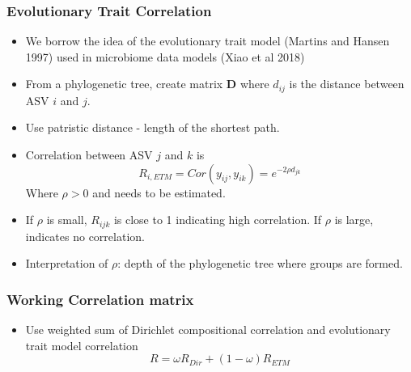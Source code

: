 \documentclass{beamer}
\begin{document}
\begin{frame}
\frametitle{Evolutionary Trait Correlation}
\begin{itemize}
  \item We borrow the idea of the evolutionary trait model (Martins and Hansen 1997) used in microbiome data models (Xiao et al 2018)
  \item From a phylogenetic tree, create matrix $\mathbf{D}$ where $d_{ij}$ is the distance between ASV $i$ and $j$.
  \item Use patristic distance - length of the shortest path.
  \item Correlation between ASV $j$ and $k$ is
  $$R_{i,ETM} = Cor(y_{ij}, y_{ik})  = e^{-2\rho d_{jk}}$$ Where $\rho > 0$ and needs to be estimated.
\item If $\rho$ is small, $R_{ijk}$ is close to 1 indicating high correlation. If $\rho$ is large, indicates no correlation.
  \item Interpretation of $\rho$: depth of the phylogenetic tree where groups are formed.
\end{itemize}
\end{frame}


\begin{frame}
\frametitle{Working Correlation matrix}
\begin{itemize}
  \item Use weighted sum of Dirichlet compositional correlation and evolutionary trait model correlation
  \[R = \omega R_{Dir} + (1-\omega)R_{ETM} \]
\end{itemize}
\end{frame}
\end{document}
